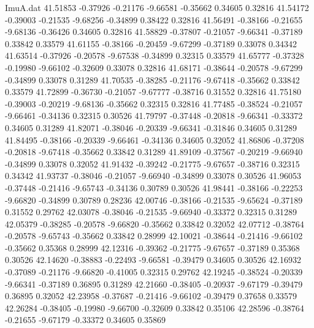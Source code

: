 \begin{filecontents}{ImuA.dat}
  41.51853   -0.37926   -0.21176   -9.66581   -0.35662    0.34605    0.32816
  41.54172   -0.39003   -0.21535   -9.68256   -0.34899    0.38422    0.32816
  41.56491   -0.38166   -0.21655   -9.68136   -0.36426    0.34605    0.32816
  41.58829   -0.37807   -0.21057   -9.66341   -0.37189    0.33842    0.33579
  41.61155   -0.38166   -0.20459   -9.67299   -0.37189    0.33078    0.34342
  41.63514   -0.37926   -0.20578   -9.67538   -0.34899    0.32315    0.33579
  41.65777   -0.37328   -0.19980   -9.66102   -0.32609    0.33078    0.32816
  41.68171   -0.38644   -0.20578   -9.67299   -0.34899    0.33078    0.31289
  41.70535   -0.38285   -0.21176   -9.67418   -0.35662    0.33842    0.33579
  41.72899   -0.36730   -0.21057   -9.67777   -0.38716    0.31552    0.32816
  41.75180   -0.39003   -0.20219   -9.68136   -0.35662    0.32315    0.32816
  41.77485   -0.38524   -0.21057   -9.66461   -0.34136    0.32315    0.30526
  41.79797   -0.37448   -0.20818   -9.66341   -0.33372    0.34605    0.31289
  41.82071   -0.38046   -0.20339   -9.66341   -0.31846    0.34605    0.31289
  41.84495   -0.38166   -0.20339   -9.66461   -0.34136    0.34605    0.32052
  41.86806   -0.37208   -0.20818   -9.67418   -0.35662    0.33842    0.31289
  41.89109   -0.37567   -0.20219   -9.66940   -0.34899    0.33078    0.32052
  41.91432   -0.39242   -0.21775   -9.67657   -0.38716    0.32315    0.34342
  41.93737   -0.38046   -0.21057   -9.66940   -0.34899    0.33078    0.30526
  41.96053   -0.37448   -0.21416   -9.65743   -0.34136    0.30789    0.30526
  41.98441   -0.38166   -0.22253   -9.66820   -0.34899    0.30789    0.28236
  42.00746   -0.38166   -0.21535   -9.65624   -0.37189    0.31552    0.29762
  42.03078   -0.38046   -0.21535   -9.66940   -0.33372    0.32315    0.31289
  42.05379   -0.38285   -0.20578   -9.66820   -0.35662    0.33842    0.32052
  42.07712   -0.38764   -0.20578   -9.65743   -0.35662    0.33842    0.28999
  42.10021   -0.38644   -0.21416   -9.66102   -0.35662    0.35368    0.28999
  42.12316   -0.39362   -0.21775   -9.67657   -0.37189    0.35368    0.30526
  42.14620   -0.38883   -0.22493   -9.66581   -0.39479    0.34605    0.30526
  42.16932   -0.37089   -0.21176   -9.66820   -0.41005    0.32315    0.29762
  42.19245   -0.38524   -0.20339   -9.66341   -0.37189    0.36895    0.31289
  42.21660   -0.38405   -0.20937   -9.67179   -0.39479    0.36895    0.32052
  42.23958   -0.37687   -0.21416   -9.66102   -0.39479    0.37658    0.33579
  42.26284   -0.38405   -0.19980   -9.66700   -0.32609    0.33842    0.35106
  42.28596   -0.38764   -0.21655   -9.67179   -0.33372    0.34605    0.35869

\end{filecontents}
